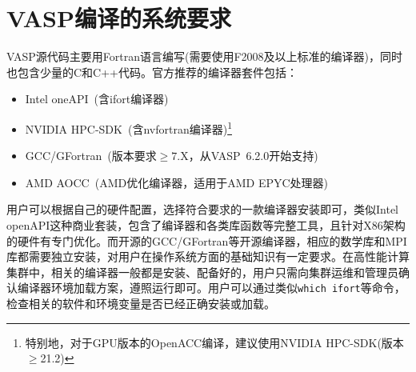 \section{\rm{VASP}编译的系统要求}
\textrm{VASP}源代码主要用\textrm{Fortran}语言编写(需要使用\textrm{F2008}及以上标准的编译器)，同时也包含少量的\textrm{C}和\textrm{C++}代码。官方推荐的编译器套件包括：
\begin{itemize}
	\item \textrm{Intel oneAPI}~(含\textrm{ifort}编译器)
	\item \textrm{NVIDIA HPC-SDK}~(含\textrm{nvfortran}编译器)\footnote{特别地，对于\textrm{GPU}版本的\textrm{OpenACC}编译，建议使用\textrm{NVIDIA HPC-SDK}(版本$\geqslant$21.2)}
	\item \textrm{GCC/GFortran}~(版本要求$\geqslant\mathrm{7.X}$，从\textrm{VASP~6.2.0}开始支持)
        \item \textrm{AMD AOCC}~(\textrm{AMD}优化编译器，适用于\textrm{AMD EPYC}处理器)
\end{itemize}
用户可以根据自己的硬件配置，选择符合要求的一款编译器安装即可，类似\textrm{Intel openAPI}这种商业套装，包含了编译器和各类库函数等完整工具，且针对\textrm{X86}架构的硬件有专门优化。而开源的\textrm{GCC/GFortran}等开源编译器，相应的数学库和\textrm{MPI}库都需要独立安装，对用户在操作系统方面的基础知识有一定要求。在高性能计算集群中，相关的编译器一般都是安装、配备好的，用户只需向集群运维和管理员确认编译器环境加载方案，遵照运行即可。用户可以通过类似\texttt{which ifort}等命令，检查相关的软件和环境变量是否已经正确安装或加载。

